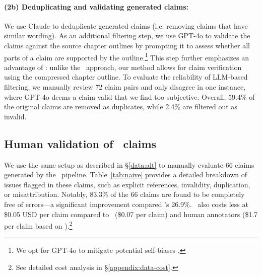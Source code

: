 \paragraph{(2b) Deduplicating and validating generated claims:} We use Claude to deduplicate generated claims (i.e. removing claims that have similar wording). As an additional filtering step, we use GPT-4o to validate the claims against the source chapter outlines by prompting it to assess whether all parts of a claim are supported by the outline.\footnote{We opt for GPT-4o to mitigate potential self-biases \cite{xu2024prideprejudicellmamplifies, panickssery2024llmevaluatorsrecognizefavor, li2025preferenceleakagecontaminationproblem}.} This step further emphasizes an advantage of \pipeline: unlike the \naive\ approach, our method allows for claim verification using the compressed chapter outline. To evaluate the reliability of LLM-based filtering, we manually review 72 claim pairs
and only disagree in one instance, where GPT-4o deems a claim valid that we find too subjective. Overall, 59.4\% of the original claims are removed as duplicates, while 2.4\% are filtered out as invalid.

\subsection{Human validation of \pipeline\ claims}
\label{data:claim_validation}

We use the same setup as described in \S\ref{data:alt} to manually evaluate 66 claims generated by the \pipeline\ pipeline. Table~\ref{tab:naive} provides a detailed breakdown of issues flagged in these claims, such as explicit references, invalidity, duplication, or misattribution. Notably, 83.3\% of the 66 claims are found to be completely free of errors—a significant improvement compared \naive's 26.9\%. \pipeline\ also costs less at \$0.05 USD per claim compared to \naive\ (\$0.07 per claim) and human annotators (\$1.7 per claim based on \citealt{karpinska_one_2024}).\footnote{See detailed cost analysis in \S\ref{appendix:data-cost}.} 

